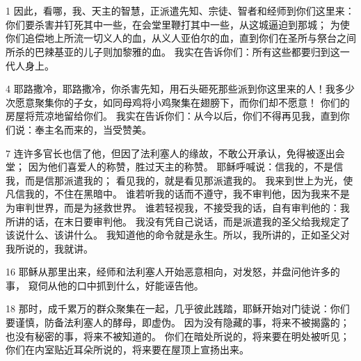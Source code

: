 
\section{}

1  因此，看哪，我、天主的智慧，正派遣先知、宗徒、智者和经师到你们这里来：你们要杀害并钉死其中一些，在会堂里鞭打其中一些，从这城逼迫到那城； 为使你们追偿地上所流一切义人的血，从义人亚伯尔的血，直到你们在圣所与祭台之间所杀的巴辣基亚的儿子则加黎雅的血。 我实在告诉你们：所有这些都要归到这一代人身上。\par

4  耶路撒冷，耶路撒冷，你杀害先知，用石头砸死那些派到你这里来的人！我多少次愿意聚集你的子女，如同母鸡将小鸡聚集在翅膀下，而你们却不愿意！ 你们的房屋将荒凉地留给你们。 我实在告诉你们：从今以后，你们不得再见我，直到你们说：奉主名而来的，当受赞美。\par

7  连许多官长也信了他，但因了法利塞人的缘故，不敢公开承认，免得被逐出会堂； 因为他们喜爱人的称赞，胜过天主的称赞。 耶稣呼喊说：信我的，不是信我，而是信那派遣我的； 看见我的，就是看见那派遣我的。 我来到世上为光，使凡信我的，不住在黑暗中。 谁若听我的话而不遵守，我不审判他，因为我来不是为审判世界，而是为拯救世界。 谁若轻视我，不接受我的话，自有审判他的：我所讲的话，在末日要审判他。 我没有凭自己说话，而是派遣我的圣父给我规定了该说什么、该讲什么。 我知道他的命令就是永生。所以，我所讲的，正如圣父对我所说的，我就讲。\par

16  耶稣从那里出来，经师和法利塞人开始恶意相向，对发怒，并盘问他许多的事， 窥伺从他的口中抓到什么，好能诬告他。\par

18  那时，成千累万的群众聚集在一起，几乎彼此践踏，耶稣开始对门徒说：你们要谨慎，防备法利塞人的酵母，即虚伪。 因为没有隐藏的事，将来不被揭露的；也没有秘密的事，将来不被知道的。 你们在暗处所说的，将来要在明处被听见；你们在内室贴近耳朵所说的，将来要在屋顶上宣扬出来。\par

